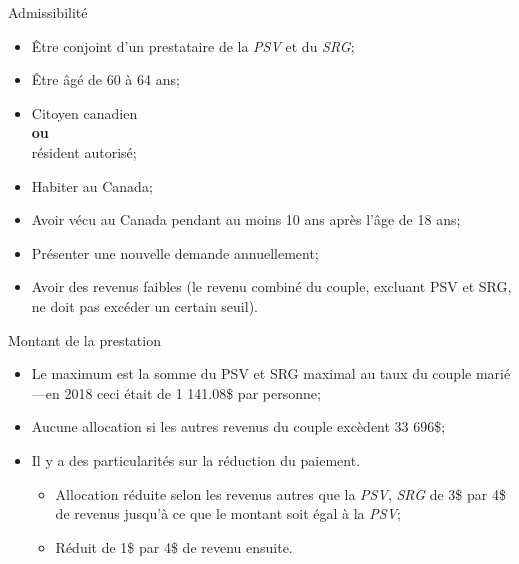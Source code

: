 \documentclass[10pt, french]{article}
\begin{document}
\begin{multicols*}{3}
\begin{conceptgen}{Admissibilité}
\begin{itemize}[leftmargin = *]
	\item	Être conjoint d'un prestataire de la \textit{PSV} et du \textit{SRG};
	\item	Être âgé de 60 à 64 ans;
	\item	Citoyen canadien \\
			\textbf{ou}\\
			résident autorisé;
	\item	Habiter au Canada;
	\item	Avoir vécu au Canada pendant au moins 10 ans après l'âge de 18 ans;
	\item	Présenter une nouvelle demande annuellement;
	\item	Avoir des revenus faibles (le revenu combiné du couple, excluant PSV et SRG, ne doit pas excéder un certain seuil).
\end{itemize}
\end{conceptgen}

\begin{conceptgen}{Montant de la prestation}

\begin{itemize}[leftmargin = *]
	\item	Le maximum est la somme du PSV et SRG maximal au taux du couple marié---en 2018 ceci était de 1 141.08\$ par personne;
	\item	Aucune allocation si les autres revenus du couple excèdent 33 696\$;
	\item	Il y a des particularités sur la réduction du paiement.
			\begin{itemize}[leftmargin = *]
			\item   Allocation réduite selon les revenus autres que la \textit{PSV}, \textit{SRG} de 3\$ par 4\$ de revenus jusqu'à ce que le montant soit égal à la \textit{PSV};
			\item   Réduit de 1\$ par 4\$ de revenu ensuite. 
			\end{itemize}
\end{itemize}
\end{conceptgen}


\end{multicols*}
\end{document}
